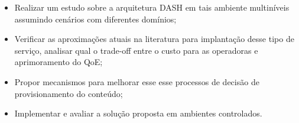 \begin{itemize}
	\item Realizar um estudo sobre a arquitetura DASH em tais ambiente multiníveis assumindo cenários com diferentes domínios;

    \item Verificar as aproximações atuais na literatura para implantação desse tipo de serviço, analisar qual o trade-off entre o custo para as operadoras e aprimoramento do QoE;
    
    \item Propor mecanismos para melhorar esse esse processos de decisão de provisionamento do conteúdo;
    
    \item Implementar e avaliar a solução proposta em ambientes controlados.%
\end{itemize}


